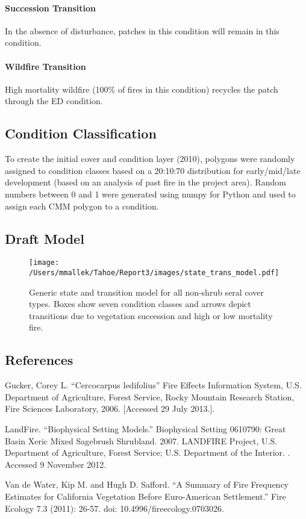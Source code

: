 \paragraph{Succession Transition} In the absence of disturbance, patches in this condition will remain in this condition. 

\paragraph{Wildfire Transition} High mortality wildfire (100\% of fires in this condition) recycles the patch through the ED condition.

\noindent\hrulefill

\subsection*{Condition Classification}
To create the initial cover and condition layer (2010), polygons were randomly assigned to condition classes based on a 20:10:70 distribution for early/mid/late development (based on an analysis of past fire in the project area). Random numbers between 0 and 1 were generated using numpy for Python and used to assign each CMM polygon to a condition.

\subsection*{Draft Model}
\begin{figure}[htbp]
\centering
\texttt{[image: /Users/mmallek/Tahoe/Report3/images/state\_trans\_model.pdf]}
\caption{Generic state and transition model for all non-shrub seral cover types. Boxes show seven condition classes and arrows depict transitions due to vegetation succession and high or low mortality fire.} 
\label{cmm_transmodel}
\end{figure}

\clearpage
\subsection*{References}
\begin{hangparas}{.25in}{1} Gucker, Corey L. ``Cercocarpus ledifolius'' Fire Effects Information System, U.S. Department of Agriculture, Forest Service, Rocky Mountain Research Station, Fire Sciences Laboratory, 2006.   [Accessed 29 July 2013.]. 

LandFire. ``Biophysical Setting Models.'' Biophysical Setting 0610790: Great Basin Xeric Mixed Sagebrush Shrubland. 2007. LANDFIRE Project, U.S. Department of Agriculture, Forest Service; U.S. Department of the Interior. . Accessed 9 November 2012.

Van de Water, Kip M. and Hugh D. Safford. ``A Summary of Fire Frequency Estimates for California Vegetation Before Euro-American Settlement.'' Fire Ecology 7.3 (2011): 26-57. doi: 10.4996/fireecology.0703026.

\end{hangparas}


